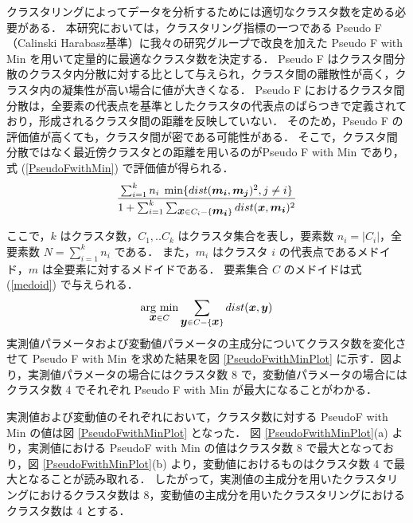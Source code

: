\documentclass[technicalreport]{ieicej}
\begin{document}
クラスタリングによってデータを分析するためには適切なクラスタ数を定める必要がある．
本研究においては，クラスタリング指標の一つである Pseudo F（Calinski Harabasz基準）\cite{liu2010understanding}に我々の研究グループで改良を加えた Pseudo F with Min\cite{kanajiri} を用いて定量的に最適なクラスタ数を決定する．
Pseudo F はクラスタ間分散のクラスタ内分散に対する比として与えられ，クラスタ間の離散性が高く，クラスタ内の凝集性が高い場合に値が大きくなる．
Pseudo F におけるクラスタ間分散は，全要素の代表点を基準としたクラスタの代表点のばらつきで定義されており，形成されるクラスタ間の距離を反映していない．
そのため，Pseudo F の評価値が高くても，クラスタ間が密である可能性がある．
そこで，クラスタ間分散ではなく最近傍クラスタとの距離を用いるのがPseudo F with Min であり，式 (\ref{PseudoFwithMin}) で評価値が得られる．
\begin{equation}
\frac{\sum^k_{i=1} n_{i}\hspace{0.1cm} \min \{ dist(\mbox{\boldmath $m_{i}$},\mbox{\boldmath $m_j$})^2,j \neq i \}}{1 + \sum^k_{i=1} \sum_{\mbox{\boldmath $x$} \in C_i - \{\mbox{\boldmath $m_i$}\}} dist(\mbox{\boldmath $x$},\mbox{\boldmath $m_{i}$})^2}
\label{PseudoFwithMin}
\end{equation}

ここで，$k$ はクラスタ数，$C_1,..C_k$ はクラスタ集合を表し，要素数 $n_i=|C_i|$，全要素数 $N=\sum_{i=1}^k n_i$ である．
また，$m_i$ はクラスタ $i$ の代表点であるメドイド\cite{mouratidis2005medoid}，$m$ は全要素に対するメドイドである．
要素集合 $C$ のメドイドは式 (\ref{medoid}) で与えられる．
\begin{equation}
\mathop{\rm arg~min}\limits_{\mbox{\boldmath $x$} \in C} \sum_{\mbox{\boldmath $y$} \in C - \{\mbox{\boldmath $x$}\}} dist(\mbox{\boldmath $x$},\mbox{\boldmath $y$})
\label{medoid}
\end{equation}
実測値パラメータおよび変動値パラメータの主成分についてクラスタ数を変化させて Pseudo F with Min を求めた結果を図 \ref{PseudoFwithMinPlot} に示す．図より，実測値パラメータの場合にはクラスタ数 8 で，変動値パラメータの場合にはクラスタ数 4 でそれぞれ Pseudo F with Min が最大になることがわかる．


実測値および変動値のそれぞれにおいて，クラスタ数に対する PseudoF with Min の値は図 \ref{PseudoFwithMinPlot} となった．
図 \ref{PseudoFwithMinPlot}(a) より，実測値における PseudoF with Min の値はクラスタ数 8 で最大となっており，図 \ref{PseudoFwithMinPlot}(b) より，変動値におけるものはクラスタ数 4 で最大となることが読み取れる．
したがって，実測値の主成分を用いたクラスタリングにおけるクラスタ数は 8，変動値の主成分を用いたクラスタリングにおけるクラスタ数は 4 とする．
\end{document}
